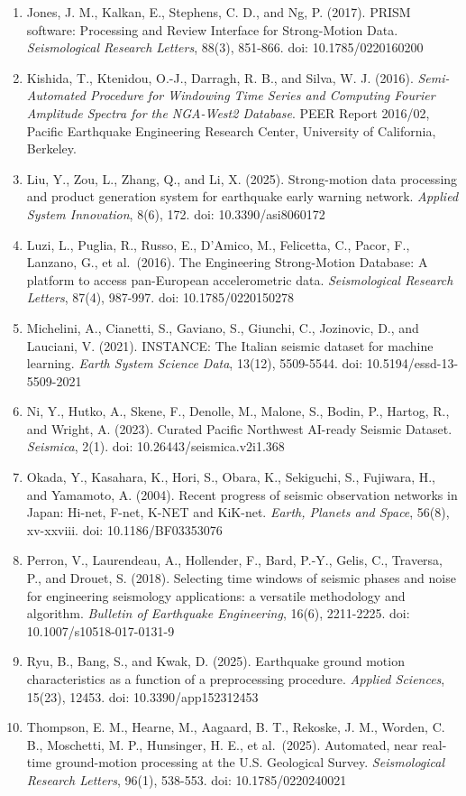 \documentclass[UTF8,a4paper,zihao=5]{ctexart}
\begin{document}
\begin{enumerate}
\item
  Jones, J. M., Kalkan, E., Stephens, C. D., and Ng, P. (2017). PRISM software: Processing and Review Interface for Strong-Motion Data. \emph{Seismological Research Letters}, 88(3), 851-866. doi: 10.1785/0220160200
\item
  Kishida, T., Ktenidou, O.-J., Darragh, R. B., and Silva, W. J. (2016). \emph{Semi-Automated Procedure for Windowing Time Series and Computing Fourier Amplitude Spectra for the NGA-West2 Database}. PEER Report 2016/02, Pacific Earthquake Engineering Research Center, University of California, Berkeley.
\item
  Liu, Y., Zou, L., Zhang, Q., and Li, X. (2025). Strong-motion data processing and product generation system for earthquake early warning network. \emph{Applied System Innovation}, 8(6), 172. doi: 10.3390/asi8060172
\item
  Luzi, L., Puglia, R., Russo, E., D'Amico, M., Felicetta, C., Pacor, F., Lanzano, G., et al.~(2016). The Engineering Strong-Motion Database: A platform to access pan-European accelerometric data. \emph{Seismological Research Letters}, 87(4), 987-997. doi: 10.1785/0220150278
\item
  Michelini, A., Cianetti, S., Gaviano, S., Giunchi, C., Jozinovic, D., and Lauciani, V. (2021). INSTANCE: The Italian seismic dataset for machine learning. \emph{Earth System Science Data}, 13(12), 5509-5544. doi: 10.5194/essd-13-5509-2021
\item
  Ni, Y., Hutko, A., Skene, F., Denolle, M., Malone, S., Bodin, P., Hartog, R., and Wright, A. (2023). Curated Pacific Northwest AI-ready Seismic Dataset. \emph{Seismica}, 2(1). doi: 10.26443/seismica.v2i1.368
\item
  Okada, Y., Kasahara, K., Hori, S., Obara, K., Sekiguchi, S., Fujiwara, H., and Yamamoto, A. (2004). Recent progress of seismic observation networks in Japan: Hi-net, F-net, K-NET and KiK-net. \emph{Earth, Planets and Space}, 56(8), xv-xxviii. doi: 10.1186/BF03353076
\item
  Perron, V., Laurendeau, A., Hollender, F., Bard, P.-Y., Gelis, C., Traversa, P., and Drouet, S. (2018). Selecting time windows of seismic phases and noise for engineering seismology applications: a versatile methodology and algorithm. \emph{Bulletin of Earthquake Engineering}, 16(6), 2211-2225. doi: 10.1007/s10518-017-0131-9
\item
  Ryu, B., Bang, S., and Kwak, D. (2025). Earthquake ground motion characteristics as a function of a preprocessing procedure. \emph{Applied Sciences}, 15(23), 12453. doi: 10.3390/app152312453
\item
  Thompson, E. M., Hearne, M., Aagaard, B. T., Rekoske, J. M., Worden, C. B., Moschetti, M. P., Hunsinger, H. E., et al.~(2025). Automated, near real-time ground-motion processing at the U.S. Geological Survey. \emph{Seismological Research Letters}, 96(1), 538-553. doi: 10.1785/0220240021
\end{enumerate}
\end{document}
